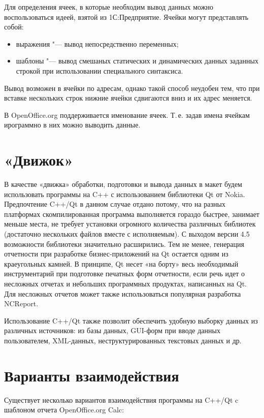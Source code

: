\documentclass[10pt, a5paper]{article}
\begin{document}
Для определения ячеек, в которые необходим вывод данных можно воспользоваться идеей, взятой из 1С:Предприятие. Ячейки могут представлять собой:
\begin{itemize}
\item выражения "--- вывод непосредственно переменных;
\item шаблоны "--- вывод смешаных статических и динамических данных заданных строкой при использовании специального синтаксиса.
\end{itemize}

Вывод возможен в ячейки по адресам, однако такой способ неудобен тем, что при вставке нескольких строк нижние ячейки сдвигаются вниз и их адрес меняется.

В OpenOffice.org поддерживается именование ячеек. Т.\,е. задав имена ячейкам ирограммно в них можно выводить данные.

\section*{«Движок»}
В качестве «движка» обработки, подготовки и вывода данных в макет будем использовать программы на C++ с использованием библиотеки Qt от Nokia. Предпочтение C++/Qt в данном случае отдано потому, что на разных платформах скомпилированная программа выполняется гораздо быстрее, занимает меньше места, не требует установки огромного количества различных библиотек (достаточно нескольких файлов вместе с исполняемым).
С выходом версии 4.5 возможности библиотеки значительно расширились. Тем не менее, генерация отчетности при разработке бизнес-приложений на Qt остается одним из краеугольных камней. В принципе, Qt несет «на борту» весь необходимый инструментарий при подготовке печатных форм отчетности, если речь идет о несложных отчетах и небольших программных продуктах, написанных на Qt. Для несложных отчетов может также использоваться популярная разработка NCReport.

Использование C++/Qt также позволит обеспечить удобную выборку данных из различных источников: из базы данных, GUI-форм при вводе данных пользователем, XML-данных, неструктурированных текстовых данных и др.

\section*{Варианты взаимодействия}

Существует несколько вариантов взаимодействия программы на C++/Qt c шаблоном отчета OpenOffice.org Calc:
\end{document}
